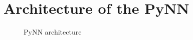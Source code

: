 \chapter{Architecture of the PyNN}
\begin{figure}[htb]
    \centering
    \begin{turn}{90}
        
    \end{turn}
    \caption{PyNN architecture}
    \label{fig:pynn_arch}
\end{figure}